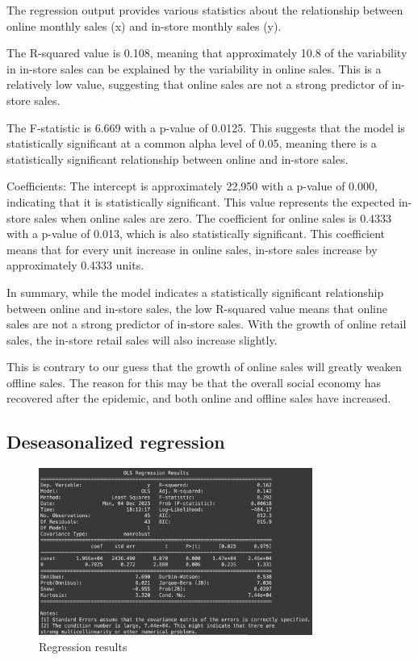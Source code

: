 \documentclass{article}
\begin{document}
The regression output provides various statistics about the relationship between online monthly sales (x) and in-store monthly sales (y).

The R-squared value is 0.108, meaning that approximately 10.8 of the variability in in-store sales can be explained by the variability in online sales. This is a relatively low value, suggesting that online sales are not a strong predictor of in-store sales.

The F-statistic is 6.669 with a p-value of 0.0125. This suggests that the model is statistically significant at a common alpha level of 0.05, meaning there is a statistically significant relationship between online and in-store sales.

Coefficients:
The intercept is approximately 22,950 with a p-value of 0.000, indicating that it is statistically significant. This value represents the expected in-store sales when online sales are zero.
The coefficient for online sales is 0.4333 with a p-value of 0.013, which is also statistically significant. This coefficient means that for every unit increase in online sales, in-store sales increase by approximately 0.4333 units.

In summary, while the model indicates a statistically significant relationship between online and in-store sales, the low R-squared value means that online sales are not a strong predictor of in-store sales. With the growth of online retail sales, the in-store retail sales will also increase slightly.

This is contrary to our guess that the growth of online sales will greatly weaken offline sales. The reason for this may be that the overall social economy has recovered after the epidemic, and both online and offline sales have increased.

\subsection{Deseasonalized regression}

\begin{figure}[h]
  \centering
  \includegraphics[width=0.8\textwidth]{Deseasonalized regression.png}
  \caption{Regression results}
  \label{fig:yourlabel}
\end{figure}
\end{document}
